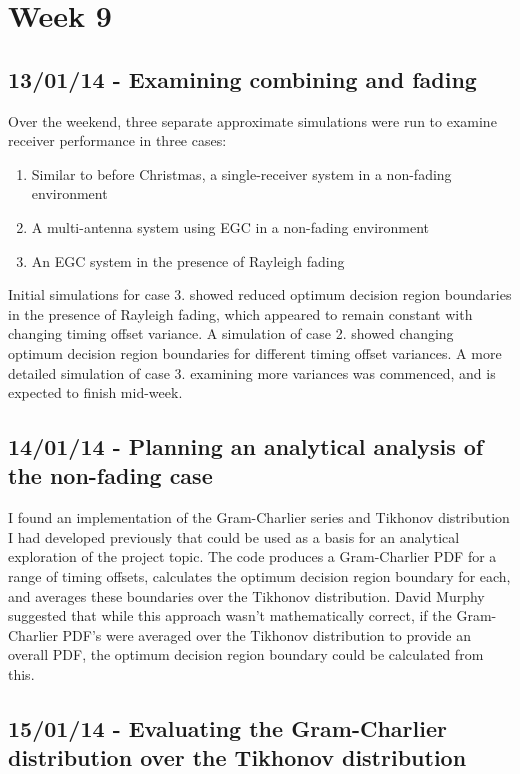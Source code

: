 \section{Week 9}

\subsection{13/01/14 - Examining combining and fading}

Over the weekend, three separate approximate simulations were run to
examine receiver performance in three cases:

\begin{enumerate}
\def\labelenumi{\arabic{enumi}.}
\itemsep1pt\parskip0pt
\item
  Similar to before Christmas, a single-receiver system in a non-fading
  environment
\item
  A multi-antenna system using EGC in a non-fading environment
\item
  An EGC system in the presence of Rayleigh fading
\end{enumerate}

Initial simulations for case 3. showed reduced optimum decision region
boundaries in the presence of Rayleigh fading, which appeared to remain
constant with changing timing offset variance. A simulation of case 2.
showed changing optimum decision region boundaries for different timing
offset variances. A more detailed simulation of case 3. examining more
variances was commenced, and is expected to finish mid-week.

\subsection{14/01/14 - Planning an analytical analysis of the non-fading
case}

I found an implementation of the Gram-Charlier series and Tikhonov
distribution I had developed previously that could be used as a basis
for an analytical exploration of the project topic. The code produces a
Gram-Charlier PDF for a range of timing offsets, calculates the optimum
decision region boundary for each, and averages these boundaries over
the Tikhonov distribution. David Murphy suggested that while this approach
wasn't mathematically correct, if the Gram-Charlier PDF's were averaged
over the Tikhonov distribution to provide an overall PDF, the optimum
decision region boundary could be calculated from this.

\subsection{15/01/14 - Evaluating the Gram-Charlier distribution over
the Tikhonov distribution}

